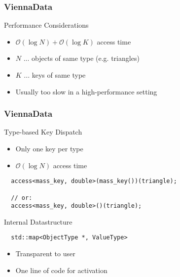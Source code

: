 





\begin{frame}[fragile]
\frametitle{ViennaData}

 \begin{block}{Performance Considerations}
   \begin{itemize}
    \item $\mathcal{O}(\log N) + \mathcal{O}(\log K)$ access time
    \item $N$ ... objects of same type (e.g. triangles)
    \item $K$ ... keys of same type
    \item Usually too slow in a high-performance setting
   \end{itemize}
 \end{block}

\end{frame}




\begin{frame}[fragile]
\frametitle{ViennaData}

 \begin{block}{Type-based Key Dispatch}
   \begin{itemize}
    \item Only one key per type
    \item $\mathcal{O}(\log N)$ access time
   \end{itemize}
\begin{lstlisting}
  access<mass_key, double>(mass_key())(triangle);
  
  // or:
  access<mass_key, double>()(triangle);
\end{lstlisting} 
 \end{block}

 \begin{block}{Internal Datastructure}
\begin{lstlisting}
  std::map<ObjectType *, ValueType>
\end{lstlisting} 
   \begin{itemize}
    \item Transparent to user
    \item One line of code for activation
   \end{itemize}
 \end{block}
\end{frame}


